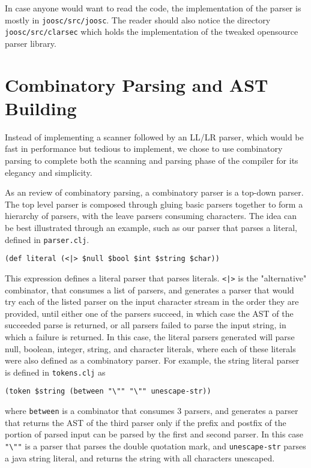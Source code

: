 \documentclass[12pt]{article}
\begin{document}
In case anyone would want to read the code, the implementation of the parser is
mostly in \texttt{joosc/src/joosc}. The reader should also notice the directory
\texttt{joosc/src/clarsec} which holds the implementation of the tweaked
opensource parser library.

\section{Combinatory Parsing and AST Building}

Instead of implementing a scanner followed by an LL/LR parser, which would be
fast in performance but tedious to implement, we chose to use combinatory
parsing to complete both the scanning and parsing phase of the compiler for its
elegancy and simplicity.

As an review of combinatory parsing, a combinatory parser is a top-down
parser. The top level parser is composed through gluing basic parsers together
to form a hierarchy of parsers, with the leave parsers consuming characters. The
idea can be best illustrated through an example, such as our parser that parses
a literal, defined in \texttt{parser.clj}.

\begin{verbatim}
(def literal (<|> $null $bool $int $string $char))
\end{verbatim}

This expression defines a literal parser that parses literals. \verb'<|>' is the
"alternative" combinator, that consumes a list of parsers, and generates a
parser that would try each of the listed parser on the input character stream in
the order they are provided, until either one of the parsers succeed, in which
case the AST of the succeeded parse is returned, or all parsers failed to parse
the input string, in which a failure is returned. In this case, the literal
parsers generated will parse null, boolean, integer, string, and character
literals, where each of these literals were also defined as a combinatory
parser. For example, the string literal parser is defined in \texttt{tokens.clj}
as

\begin{verbatim}
(token $string (between "\"" "\"" unescape-str))
\end{verbatim}

\noindent where \texttt{between} is a combinator that consumes 3 parsers, and
generates a parser that returns the AST of the third parser only if the prefix
and postfix of the portion of parsed input can be parsed by the first and second
parser. In this case \verb'"\""' is a parser that parses the double quotation
mark, and \texttt{unescape-str} parses a java string literal, and returns the
string with all characters unescaped.
\end{document}
